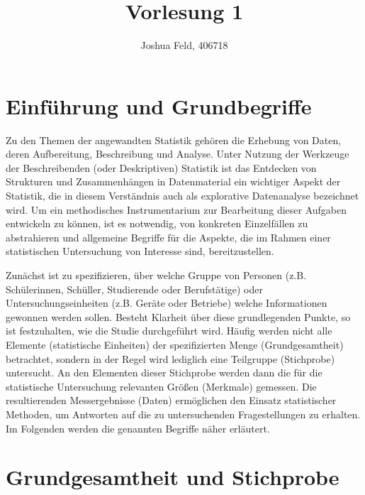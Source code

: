 \documentclass{lecture}
\institute{Institut für Statistik und Wirtschaftsmathematik}
\title{Vorlesung 1}
\author{Joshua Feld, 406718}
\begin{document}
    \maketitle


    \section*{Einführung und Grundbegriffe}

    Zu den Themen der angewandten Statistik gehören die Erhebung von Daten, deren Aufbereitung, Beschreibung und Analyse.
    Unter Nutzung der Werkzeuge der Beschreibenden (oder Deskriptiven) Statistik ist das Entdecken von Strukturen und Zusammenhängen in Datenmaterial ein wichtiger Aspekt der Statistik, die in diesem Verständnis auch als explorative Datenanalyse bezeichnet wird.
    Um ein methodisches Instrumentarium zur Bearbeitung dieser Aufgaben entwickeln zu können, ist es notwendig, von konkreten Einzelfällen zu abstrahieren und allgemeine Begriffe für die Aspekte, die im Rahmen einer statistischen Untersuchung von Interesse sind, bereitzustellen.

    Zunächst ist zu spezifizieren, über welche Gruppe von Personen (z.B. Schülerinnen, Schüller, Studierende oder Berufstätige) oder Untersuchungseinheiten (z.B. Geräte oder Betriebe) welche Informationen gewonnen werden sollen.
    Besteht Klarheit über diese grundlegenden Punkte, so ist festzuhalten, wie die Studie durchgeführt wird.
    Häufig werden nicht alle Elemente (statistische Einheiten) der spezifizierten Menge (Grundgesamtheit) betrachtet, sondern in der Regel wird lediglich eine Teilgruppe (Stichprobe) untersucht.
    An den Elementen dieser Stichprobe werden dann die für die statistische Untersuchung relevanten Größen (Merkmale) gemessen.
    Die resultierenden Messergebnisse (Daten) ermöglichen den Einsatz statistischer Methoden, um Antworten auf die zu untersuchenden Fragestellungen zu erhalten.
    Im Folgenden werden die genannten Begriffe näher erläutert.


    \section*{Grundgesamtheit und Stichprobe}
\end{document}
